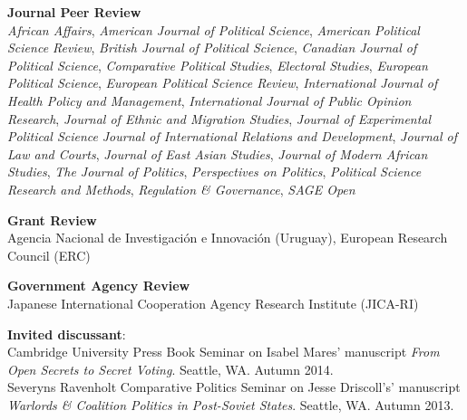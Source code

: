 \documentclass[margin,line]{res}
\begin{document}
{\begin{resume}
\textbf{Journal Peer Review}\\
\emph{African Affairs},
\emph{American Journal of Political Science},
\emph{American Political Science Review},
\emph{British Journal of Political Science},
\emph{Canadian Journal
  of Political Science},
\emph{Comparative Political Studies},
\emph{Electoral Studies},
\emph{European Political Science},
\emph{European Political Science Review},
\emph{International Journal of Health Policy and Management},
\emph{International Journal of Public Opinion Research},
\emph{Journal of Ethnic and Migration Studies},
\emph{Journal of Experimental Political Science}
\emph{Journal of International Relations and Development},
\emph{Journal of Law and Courts},
\emph{Journal of East Asian Studies},
\emph{Journal of Modern African Studies},
\emph{The Journal of Politics},
\emph{Perspectives on Politics},
\emph{Political Science Research and Methods},
\emph{Regulation \& Governance},
\emph{SAGE Open}
\par\smallskip

\textbf{Grant Review}\\
Agencia Nacional de Investigaci\'on e Innovaci\'on (Uruguay), European
Research Council (ERC)

\textbf{Government Agency Review}\\
Japanese International Cooperation Agency Research Institute (JICA-RI)


\textbf{Invited discussant}: \\
  Cambridge University Press Book Seminar on
Isabel Mares' manuscript \emph{From Open Secrets to Secret Voting}. Seattle, WA. Autumn 2014. \\
 Severyns Ravenholt Comparative Politics Seminar on
Jesse Driscoll's' manuscript \emph{Warlords \& Coalition Politics in
  Post-Soviet States}. Seattle, WA. Autumn 2013. \par\smallskip






\end{resume}}
\end{document}
